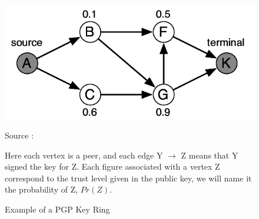 \documentclass[]{article}
\begin{document}
\begin{figure}[h]
\includegraphics{pgp-key-ring}
\centering
\caption{Example of a PGP Key Ring}
\label{fig:pgp-key-ring}
Source : \cite{haenni2007new}

Here each vertex is a peer, and each edge Y $\rightarrow$ Z means that Y signed the key for Z.
Each figure associated with a vertex Z  correspond to the trust level given in the public key, we will name it the probability of Z, $Pr(Z)$.
\end{figure}
\end{document}
